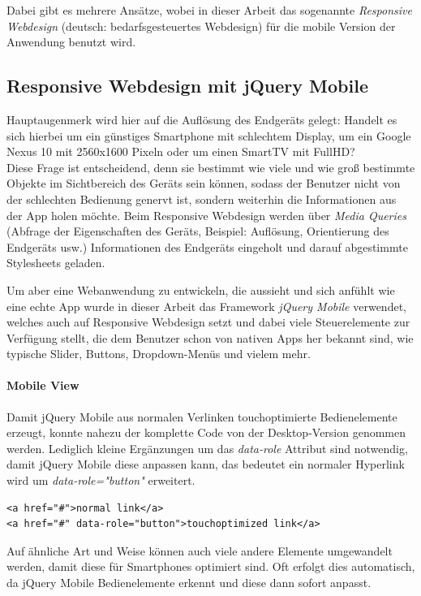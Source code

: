 Dabei gibt es mehrere Ansätze, wobei in dieser Arbeit das sogenannte \emph{Responsive Webdesign} (deutsch: bedarfsgesteuertes Webdesign) für die mobile Version der Anwendung benutzt wird.

\subsection{Responsive Webdesign mit jQuery Mobile}
Hauptaugenmerk wird hier auf die Auflösung des Endgeräts gelegt: Handelt es sich hierbei um ein günstiges Smartphone mit schlechtem Display, um ein Google Nexus 10 mit 2560x1600 Pixeln oder um einen SmartTV mit FullHD?\\
Diese Frage ist entscheidend, denn sie bestimmt wie viele und wie groß bestimmte Objekte im Sichtbereich des Geräts sein können, sodass der Benutzer nicht von der schlechten Bedienung genervt ist, sondern weiterhin die Informationen aus der App holen möchte. Beim Responsive Webdesign werden über \emph{Media Queries} (Abfrage der Eigenschaften des Geräts, Beispiel: Auflösung, Orientierung des Endgeräts usw.) Informationen des Endgeräts eingeholt und darauf abgestimmte Stylesheets geladen.\par

Um aber eine Webanwendung zu entwickeln, die aussieht und sich \glqq anfühlt\grqq{} wie eine echte App wurde in dieser Arbeit das Framework \emph{jQuery Mobile} verwendet, welches auch auf Responsive Webdesign setzt und dabei viele Steuerelemente zur Verfügung stellt, die dem Benutzer schon von nativen Apps her bekannt sind, wie typische Slider, Buttons, Dropdown-Menüs und vielem mehr.\par

\paragraph{Mobile View}
Damit jQuery Mobile aus normalen Verlinken touchoptimierte Bedienelemente erzeugt, konnte nahezu der komplette Code von der Desktop-Version genommen werden. Lediglich kleine Ergänzungen um das \emph{data-role} Attribut sind notwendig, damit jQuery Mobile diese anpassen kann, das bedeutet ein normaler Hyperlink wird um \emph{data-role="button"} erweitert.
\\
\begin{lstlisting}[captionpos=b, caption=Eine kleine Ergänzung erzeugt aus einem Link einen touchfreundlichen Button]
<a href="#">normal link</a>
<a href="#" data-role="button">touchoptimized link</a>
\end{lstlisting}

Auf ähnliche Art und Weise können auch viele andere Elemente umgewandelt werden, damit diese für Smartphones optimiert sind. Oft erfolgt dies automatisch, da jQuery Mobile Bedienelemente erkennt und diese dann sofort anpasst.
